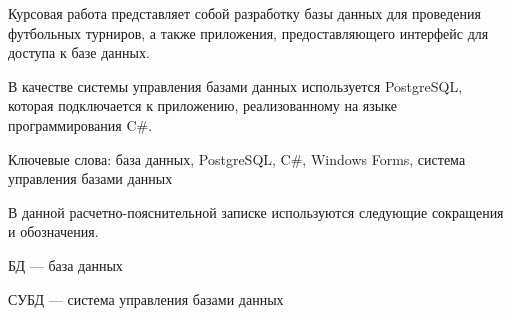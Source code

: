 \abstract

Курсовая работа представляет собой разработку базы данных для проведения футбольных турниров, а также приложения, предоставляющего интерфейс для доступа к базе данных. 

В качестве системы управления базами данных используется PostgreSQL,
которая подключается к приложению,
реализованному на языке программирования C\#.

Ключевые слова: база данных, PostgreSQL, C\#, Windows Forms, система управления базами
данных

В данной расчетно-пояснительной записке используются следующие сокращения и обозначения.

БД --- база данных

СУБД --- система управления базами данных